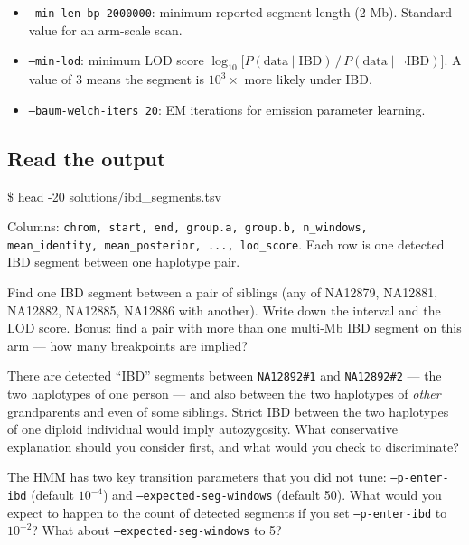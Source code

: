 \documentclass[11pt]{article}
\begin{document}
\begin{itemize}\setlength{\itemsep}{0.2em}
  \item \texttt{--min-len-bp 2000000}: minimum reported segment length
    (2 Mb). Standard value for an arm-scale scan.
  \item \texttt{--min-lod}: minimum LOD score
    $\log_{10}\!\bigl[P(\text{data}\mid\text{IBD}) \,/\, P(\text{data}\mid\neg\text{IBD})\bigr]$.
    A value of 3 means the segment is $10^3\times$ more likely under IBD.
  \item \texttt{--baum-welch-iters 20}: EM iterations for emission
    parameter learning.
\end{itemize}

\subsection*{Read the output}

\begin{cmd}
\$ head -20 solutions/ibd\_segments.tsv
\end{cmd}

Columns: \texttt{chrom, start, end, group.a, group.b, n\_windows,
mean\_identity, mean\_posterior, ..., lod\_score}. Each row is one
detected IBD segment between one haplotype pair.

\begin{quest}[2.1]
Find one IBD segment between a pair of siblings (any of NA12879, NA12881,
NA12882, NA12885, NA12886 with another). Write down the interval and the
LOD score. Bonus: find a pair with more than one multi-Mb IBD segment on
this arm --- how many breakpoints are implied?
\end{quest}

\begin{quest}[2.2]
There are detected ``IBD'' segments between \texttt{NA12892\#1} and
\texttt{NA12892\#2} --- the two haplotypes of one person --- and also
between the two haplotypes of \emph{other} grandparents and even of some
siblings. Strict IBD between the two haplotypes of one diploid individual
would imply autozygosity. What conservative explanation should you
consider first, and what would you check to discriminate?
\end{quest}

\begin{quest}[2.3]
The HMM has two key transition parameters that you did not tune:
\texttt{--p-enter-ibd} (default $10^{-4}$) and
\texttt{--expected-seg-windows} (default 50). What would you expect to
happen to the count of detected segments if you set
\texttt{--p-enter-ibd} to $10^{-2}$? What about
\texttt{--expected-seg-windows} to 5?
\end{quest}
\end{document}
